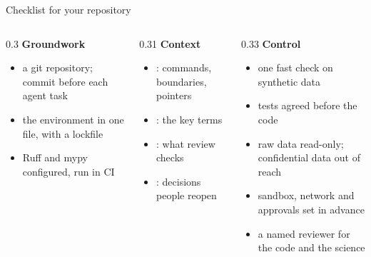 \begin{frame}{Checklist for your repository}
  \setlength\leftmargini{5mm}
  \begin{columns}[T,onlytextwidth]
    \begin{column}{0.3\textwidth}
      \textbf{\color{udsdark}Groundwork}\par\vskip1mm
      \begin{itemize}\footnotesize\setlength\itemsep{2mm}
        \item a git repository; commit before each agent task
        \item the environment in one file, with a lockfile
        \item Ruff and mypy configured, run in CI
      \end{itemize}
    \end{column}
    \begin{column}{0.31\textwidth}
      \textbf{\color{udsblue}Context}\par\vskip1mm
      \begin{itemize}\footnotesize\setlength\itemsep{2mm}
        \item {}: commands, boundaries, pointers
        \item {}: the key terms
        \item {}: what review checks
        \item {}: decisions people reopen
      \end{itemize}
    \end{column}
    \begin{column}{0.33\textwidth}
      \textbf{\color{udsred}Control}\par\vskip1mm
      \begin{itemize}\footnotesize\setlength\itemsep{2mm}
        \item one fast check on synthetic data
        \item tests agreed before the code
        \item raw data read-only; confidential data out of reach
        \item sandbox, network and approvals set in advance
        \item a named reviewer for the code and the science
      \end{itemize}
    \end{column}
  \end{columns}

\end{frame}
